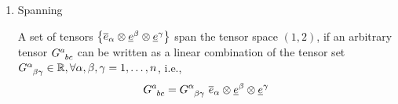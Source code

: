\documentclass[12pt,a4paper]{article}
\newcommand{\und}[1]{\underline{#1}}
\newcommand{\ovr}[1]{\overline{#1}}
\begin{document}
\begin{solution_pset}
\begin{enumerate}[(1)]
				\begin{proof}
					Consider $C\indices{^\alpha_{\beta\gamma}}\in\R$ such that
					\[
						C\indices{^\alpha_{\beta\gamma}}\ 
						\ovr e_\alpha \otimes \und e^\beta \otimes \und e^\gamma
						=
						0\indices{^{a}_{bc}}.
					\]
					Let's feed the tensor a set of basis covectors and vectors,
					$\und e^\lambda,\ovr e_\mu,\ovr e_\nu$.
					Then
					\begin{align*}
						C\indices{^\alpha_{\beta\gamma}}\ 
						\ovr e_\alpha \otimes \und e^\beta \otimes \und e^\gamma
						[
							\und e^\lambda,
							\ovr e_\mu,
							\ovr e_\nu
						]
						&=
						0\indices{^{a}_{bc}}
						[
							\und e^\lambda,
							\ovr e_\mu,
							\ovr e_\nu
						]
						\\
						C\indices{^\alpha_{\beta\gamma}}\ 
						\ovr e_\alpha[\und e^\lambda]
						\und e^\beta[\ovr e_\mu]
						\und e^\gamma[\ovr e_\nu]
						&=0
						\\
						C\indices{^\alpha_{\beta\gamma}}
						\delta\indices{^\lambda_\alpha}
						\delta\indices{^\beta_\mu}
						\delta\indices{^\gamma_\nu}
						&=0
						\\
						C\indices{^\lambda_{\beta\gamma}}
						\delta\indices{^\beta_\mu}
						\delta\indices{^\gamma_\nu}
						&=0
						\\
						C\indices{^\lambda_{\mu\gamma}}
						\delta\indices{^\gamma_\nu}
						&=0
						\\
						C\indices{^\lambda_{\mu\nu}}
						&=0.
					\end{align*}
					Since the indices $\lambda,\mu,\nu$ are arbitrary, we can replace them. Hence,
					\[
						C\indices{^\alpha_{\beta\gamma}}=0
					\]
					for all $\alpha,\beta,\gamma$.
				\end{proof}
				
				
			\item Spanning

				A set of tensors $
					\qty{
						\ovr e_\alpha \otimes \und e^\beta \otimes \und e^\gamma
					}
				$ span the tensor space $(1,2)$,
				if an arbitrary tensor $G\indices{^{a}_{bc}}$ can be written as a linear
				combination of the tensor set $G\indices{^\alpha_{\beta\gamma}}\in \R, \forall \alpha,\beta,\gamma = 1,\ldots,n$, i.e.,
				\[
					G\indices{^{a}_{bc}}
					 = 
					 G\indices{^{\alpha}_{\beta\gamma}}\ 
					\ovr e_\alpha \otimes \und e^\beta \otimes \und e^\gamma
				\]


\end{enumerate}
\end{solution_pset}
\end{document}
